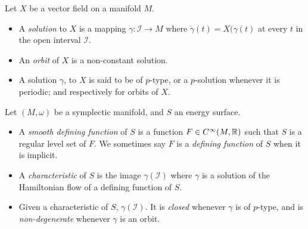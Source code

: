 \documentclass[../main-v2-manifolds.tex]{subfiles}
\begin{document}
Let $X$ be a vector field on a manifold $M$.
\begin{itemize}
    \item A \emph{solution} to $X$ is a mapping $\gamma: \mathcal{I}\to M$ where $\mathring{\gamma}(t) = X(\gamma(t)$ at every $t$ in the open interval $\mathcal{I}$.
    \item An \emph{orbit} of $X$ is a non-constant solution.
    \item A solution $\gamma$, to $X$ is said to be of $p$-type, or a $p$-solution whenever it is periodic; and respectively for orbits of $X$.
\end{itemize}
Let $(M,\omega)$ be a symplectic manifold, and $S$ an energy surface.
\begin{itemize}
    \item A \emph{smooth defining function} of $S$ is a function $F\in C^\infty(M,\mathbb{R})$ such that $S$ is a regular level set of $F$. We sometimes say $F$ is a \emph{defining function} of $S$ when it is implicit.
    \item A \emph{characteristic} of $S$ is the image $\gamma(\mathcal{I})$ where $\gamma$ is a solution of the Hamiltonian flow of a defining function of $S$. 
    \item Given a characteristic of $S$, $\gamma(\mathcal{I})$. It is \emph{closed} whenever $\gamma$ is of $p$-type, and is \emph{non-degenerate} whenever $\gamma$ is an orbit.
\end{itemize}
\end{document}
